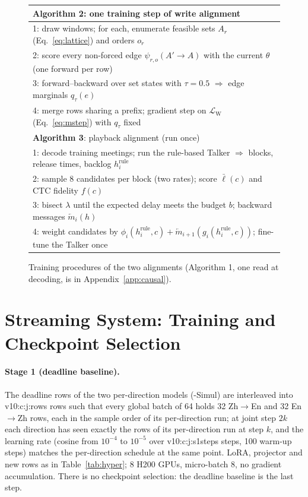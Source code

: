 \begin{figure}[t]
\small
\centering
\begin{tabular}{@{}l@{}}
\toprule
\textbf{Algorithm 2}: one training step of write alignment \\
\midrule
1: draw windows; for each, enumerate feasible sets $A_r$ (Eq.~\ref{eq:lattice}) and orders $o_r$ \\
2: score every non-forced edge $\psi_{r,o}(A'\!\to\!A)$ with the current $\theta$ (one forward per row) \\
3: forward--backward over set states with $\tau=0.5$ $\Rightarrow$ edge marginals $q_\tau(e)$ \\
4: merge rows sharing a prefix; gradient step on $\mathcal{L}_\mathrm{W}$ (Eq.~\ref{eq:mstep}) with $q_\tau$ fixed \\
\midrule
\textbf{Algorithm 3}: playback alignment (run once) \\
\midrule
1: decode training meetings; run the rule-based Talker $\Rightarrow$ blocks, release times, backlog $h^{\mathrm{rule}}_i$ \\
2: sample 8 candidates per block (two rates); score $\bar{\ell}(c)$ and CTC fidelity $f(c)$ \\
3: bisect $\lambda$ until the expected delay meets the budget $b$; backward messages $\overleftarrow{m}_i(h)$ \\
4: weight candidates by $\phi_i(h^{\mathrm{rule}}_i,c)+\overleftarrow{m}_{i+1}(g_i(h^{\mathrm{rule}}_i,c))$; fine-tune the Talker once \\
\bottomrule
\end{tabular}
\caption{Training procedures of the two alignments (Algorithm 1, one read at decoding, is in Appendix~\ref{app:causal}).}
\label{alg:train}
\end{figure}

\section{Streaming System: Training and Checkpoint Selection}
\label{app:v10train}

\paragraph{Stage 1 (deadline baseline).} The deadline rows of the two per-direction models (\sys{}-Simul) are
interleaved into \num{v10:c:j:rows} rows such that every global batch of 64 holds 32 Zh$\rightarrow$En and 32
En$\rightarrow$Zh rows, each in the sample order of its per-direction run; at joint step $2k$ each direction has seen
exactly the rows of its per-direction run at step $k$, and the learning rate (cosine from $10^{-4}$ to $10^{-5}$ over
\num{v10:c:j:s1steps} steps, 100 warm-up steps) matches the per-direction schedule at the same point. LoRA, projector and new rows as in Table~\ref{tab:hyper}; 8 H200 GPUs, micro-batch 8, no
gradient accumulation. There is no checkpoint selection: the deadline baseline is the last step.

